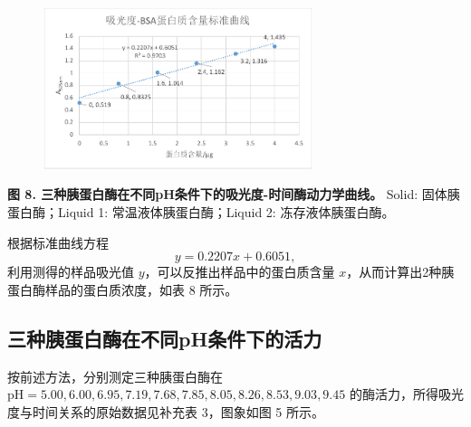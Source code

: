 \documentclass[11pt,UTF8]{ctexart}
\newenvironment{unicaption}{\noindent\small}{\normalsize}
\begin{document}
        \begin{figure}[H] %
            \centering %
            \includegraphics[width=0.7\textwidth]{stdc.pdf} %
        \end{figure}
    
        \begin{unicaption}
            \textbf{图 8. 三种胰蛋白酶在不同pH条件下的吸光度-时间酶动力学曲线。} Solid: 固体胰蛋白酶；Liquid 1: 常温液体胰蛋白酶；Liquid 2: 冻存液体胰蛋白酶。
        \end{unicaption}

        根据标准曲线方程
        \begin{equation}
            y = 0.2207x + 0.6051,
        \end{equation}
        利用测得的样品吸光值 \(y\)，可以反推出样品中的蛋白质含量 \(x\)，从而计算出2种胰蛋白酶样品的蛋白质浓度，如表 8 所示。


    \subsection{三种胰蛋白酶在不同pH条件下的活力}
        按前述方法，分别测定三种胰蛋白酶在 \(\mathrm{pH = 5.00, 6.00, 6.95, 7.19, 7.68, 7.85, 8.05, 8.26, 8.53, 9.03, 9.45}\) 的酶活力，所得吸光度与时间关系的原始数据见补充表 3，图象如图 5 所示。
\end{document}
